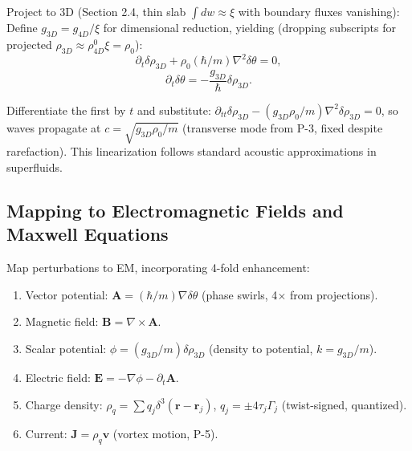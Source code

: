 Project to 3D (Section 2.4, thin slab $\int dw \approx \xi$ with boundary fluxes vanishing): Define $g_{3D} = g_{4D} / \xi$ for dimensional reduction, yielding (dropping subscripts for projected $\rho_{3D} \approx \rho_{4D}^0 \xi = \rho_0$):
\begin{equation}
\partial_t \delta \rho_{3D} + \rho_0 (\hbar / m) \nabla^2 \delta \theta = 0,
\end{equation}
\begin{equation}
\partial_t \delta \theta = -\frac{g_{3D}}{\hbar} \delta \rho_{3D}.
\end{equation}

Differentiate the first by $t$ and substitute: $\partial_{tt} \delta \rho_{3D} - (g_{3D} \rho_0 / m) \nabla^2 \delta \rho_{3D} = 0$, so waves propagate at $c = \sqrt{g_{3D} \rho_0 / m}$ (transverse mode from P-3, fixed despite rarefaction). This linearization follows standard acoustic approximations in superfluids.

\medskip
\noindent
{}
\medskip

\subsection{Mapping to Electromagnetic Fields and Maxwell Equations}

Map perturbations to EM, incorporating 4-fold enhancement:

\begin{enumerate}
\item Vector potential: $\mathbf{A} = (\hbar / m) \nabla \delta \theta$ (phase swirls, 4$\times$ from projections).
\item Magnetic field: $\mathbf{B} = \nabla \times \mathbf{A}$.
\item Scalar potential: $\phi = (g_{3D} / m) \delta \rho_{3D}$ (density to potential, $k = g_{3D}/m$).
\item Electric field: $\mathbf{E} = -\nabla \phi - \partial_t \mathbf{A}$.
\item Charge density: $\rho_q = \sum q_j \delta^3(\mathbf{r} - \mathbf{r}_j)$, $q_j = \pm 4 \tau_j \Gamma_j$ (twist-signed, quantized).
\item Current: $\mathbf{J} = \rho_q \mathbf{v}$ (vortex motion, P-5).
\end{enumerate}

